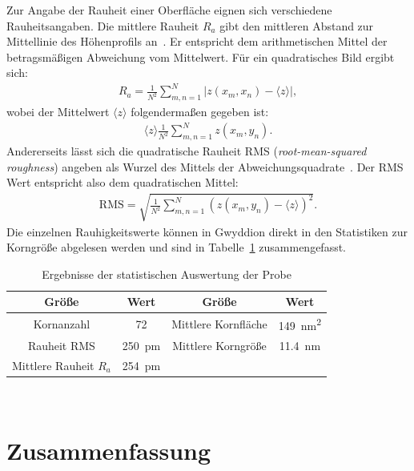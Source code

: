 \documentclass[a4paper,twoside,final]{article}
\begin{document}
Zur Angabe der Rauheit einer Oberfläche eignen sich verschiedene Rauheitsangaben. Die mittlere Rauheit $R_a$ gibt den mittleren Abstand zur Mittellinie des Höhenprofils an~\cite{Rauheit}. Er entspricht dem arithmetischen Mittel der betragsmäßigen Abweichung vom Mittelwert. Für ein quadratisches Bild ergibt sich:
\begin{align}
  R_a = \frac{1}{N^2} \sum_{m,n = 1}^N |z(x_m, x_n) - \langle z \rangle|,
\end{align}
wobei der Mittelwert $\langle z \rangle$ folgendermaßen gegeben ist:
\begin{align}
  \langle z \rangle \frac{1}{N^2} \sum_{m,n = 1}^N z(x_m, y_n).
\end{align}
Andererseits lässt sich die quadratische Rauheit RMS (\textit{root-mean-squared roughness}) angeben als Wurzel des Mittels der Abweichungsquadrate~\cite{Rauheit}.
Der RMS Wert entspricht also dem quadratischen Mittel:
\begin{align}
  \text{RMS} = \sqrt{\frac{1}{N^2}\sum_{m,n = 1}^N (z(x_m, y_n)-\langle z\rangle)^2}.
\end{align}
Die einzelnen Rauhigkeitswerte können in Gwyddion direkt in den Statistiken zur Korngröße abgelesen werden und sind in Tabelle~\ref{tab:ErgebnisseGoldprobe} zusammengefasst.
\begin{table}[ht]
	\centering
	\caption{Ergebnisse der statistischen Auswertung der Probe}
	\label{tab:ErgebnisseGoldprobe}
  \begin{tabular}{c c c c}
   \toprule
   Größe & Wert & Größe & Wert\\
   \midrule
   Kornanzahl & 72 & Mittlere Kornfläche & \SI{149}{\nano\metre\squared}\\
   Rauheit RMS & \SI{250}{\pico\metre} & Mittlere Korngröße & \SI{11.4}{\nano\metre}\\
   Mittlere Rauheit $R_a$ & \SI{254}{\pico\metre} & &\\
   \bottomrule
  \end{tabular}
\end{table}\\

\section{Zusammenfassung}
\end{document}
